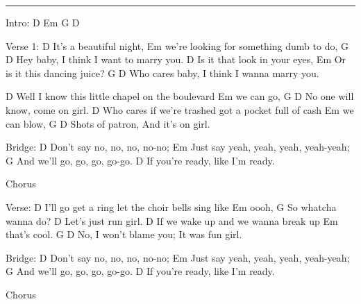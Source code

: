 \noindent\rule{\columnwidth}{1pt}


\begin{multicols}{2}
\begin{lstsong}
Intro: D  Em  G  D

Verse 1:
D                                                                          
It's a beautiful night, 
                            Em
we're looking for something dumb to do, 
    G                             D
Hey baby, I think I want to marry you. 
D
Is it that look in your eyes,
              Em
Or is it this dancing juice?
    G                                 D
Who cares baby, I think I wanna marry you.

D
Well I know this little chapel on the boulevard
       Em
we can go,
            G            D
No one will know,   come on girl.
D
Who cares if we're trashed got a pocket full of cash
       Em
we can blow,
         G                D
Shots of patron, And it's on girl.
\end{lstsong}
\columnbreak
\begin{lstsong}
Bridge:
D
Don't say no, no, no, no-no;
         Em
Just say yeah, yeah, yeah, yeah-yeah;
          G
And we'll go, go, go, go-go.
          D
If you're ready, like I'm ready.

Chorus

Verse:
D
I'll go get a ring let the choir bells sing like
Em
oooh,
                 G
So whatcha wanna do?
           D
Let's just run girl.
D
If we wake up and we wanna break up
       Em
that's cool.
                  G           D
No, I won't blame you; It was fun girl.

Bridge:
D
Don't say no, no, no, no-no;
         Em
Just say yeah, yeah, yeah, yeah-yeah;
          G
And we'll go, go, go, go-go.
          D
If you're ready, like I'm ready.

Chorus
\end{lstsong}
\end{multicols}
\newpage



